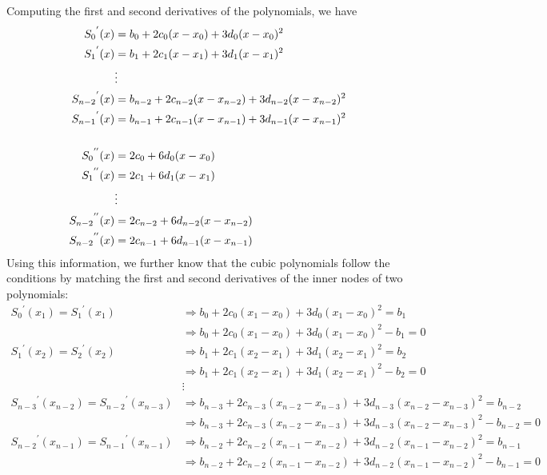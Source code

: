\begin{answer}
    Computing the first and second derivatives of the polynomials, we have
    \begin{align}
        {S_0}^{'}(x) &= b_0 + 2c_0(x-x_0) + 3d_0(x-x_0)^2\\
        {S_1}^{'}(x) &= b_1 + 2c_1(x-x_1) + 3d_1(x-x_1)^2\\
        &\vdots\\
        {S_{n-2}}^{'}(x) &= b_{n-2} + 2c_{n-2}(x-x_{n-2}) + 3d_{n-2}(x-x_{n-2})^2\\
        {S_{n-1}}^{'}(x) &= b_{n-1} + 2c_{n-1}(x-x_{n-1}) + 3d_{n-1}(x-x_{n-1})^2\\
        &\newline\\
        {S_0}^{''}(x) &= 2c_0 + 6d_0(x-x_0)\\
        {S_1}^{''}(x) &= 2c_1 + 6d_1(x-x_1)\\
        &\vdots\\
        {S_{n-2}}^{''}(x) &= 2c_{n-2} + 6d_{n-2}(x-x_{n-2})\\
        {S_{n-2}}^{''}(x) &= 2c_{n-1} + 6d_{n-1}(x-x_{n-1})
    \end{align}
    Using this information, we further know that the cubic polynomials follow the conditions by matching the first and second derivatives of the inner nodes of two polynomials:
    \begin{align}
        {S_0}^{'}(x_1) = {S_1}^{'}(x_1) &\Rightarrow b_0 + 2c_0(x_1-x_0) + 3d_0(x_1-x_0)^2 = b_1\\
        &\Rightarrow b_0 + 2c_0(x_1-x_0) + 3d_0(x_1-x_0)^2 - b_1 = 0\\
        {S_1}^{'}(x_2) = {S_2}^{'}(x_2) &\Rightarrow b_1 + 2c_1(x_2-x_1) + 3d_1(x_2-x_1)^2 = b_2\\
        &\Rightarrow b_1 + 2c_1(x_2-x_1) + 3d_1(x_2-x_1)^2 - b_2 = 0\\
        &\vdots\\
        {S_{n-3}}^{'}(x_{n-2}) = {S_{n-2}}^{'}(x_{n-3}) &\Rightarrow b_{n-3} + 2c_{n-3}(x_{n-2}-x_{n-3}) + 3d_{n-3}(x_{n-2}-x_{n-3})^2 = b_{n-2}\\
        &\Rightarrow b_{n-3} + 2c_{n-3}(x_{n-2}-x_{n-3}) + 3d_{n-3}(x_{n-2}-x_{n-3})^2 - b_{n-2} = 0\\
        {S_{n-2}}^{'}(x_{n-1}) = {S_{n-1}}^{'}(x_{n-1}) &\Rightarrow b_{n-2} + 2c_{n-2}(x_{n-1}-x_{n-2}) + 3d_{n-2}(x_{n-1}-x_{n-2})^2 = b_{n-1}\\
        &\Rightarrow b_{n-2} + 2c_{n-2}(x_{n-1}-x_{n-2}) + 3d_{n-2}(x_{n-1}-x_{n-2})^2 - b_{n-1} = 0\\

\end{align}
\end{answer}
